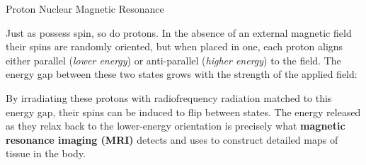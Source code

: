 \documentclass[10pt]{article}
\begin{document}
    \begin{core}{Proton Nuclear Magnetic Resonance}

      Just as  possess spin, so do protons. In the absence of an external magnetic field their spins are randomly oriented, but when placed in one, each proton aligns either parallel (\textit{lower energy}) or anti-parallel (\textit{higher energy}) to the field. The energy gap between these two states grows with the strength of the applied field:


      By irradiating these protons with radiofrequency radiation matched to this energy gap, their spins can be induced to flip between states. The energy released as they relax back to the lower-energy orientation is precisely what \textbf{magnetic resonance imaging (MRI)} detects and uses to construct detailed maps of tissue in the body.
            
    \end{core}
\end{document}
